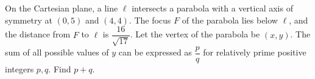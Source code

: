 On the Cartesian plane, a line $\ell$ intersects a parabola with a vertical axis of symmetry at $(0, 5)$ and $(4, 4)$. The focus $F$ of the parabola lies below $\ell$,  and the distance from $F$ to $\ell$ is $\dfrac{16}{\sqrt{17}}$. Let the vertex of the parabola be $(x, y)$. The sum of all possible values of $y$ can be expressed as $\dfrac{p}{q}$ for relatively prime positive integers $p, q$. Find $p + q$.
